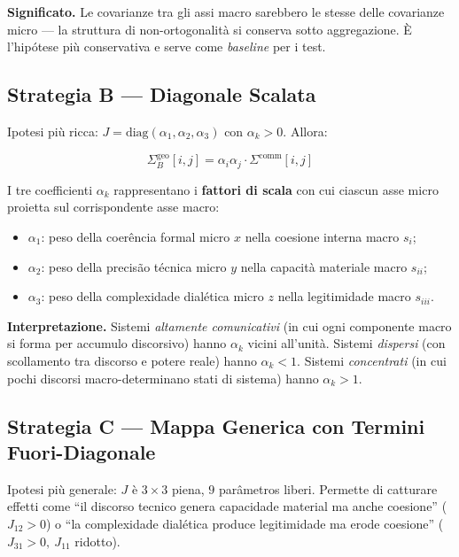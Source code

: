 \Hypoth{} \textbf{Significato.} Le covarianze tra gli assi macro
sarebbero le stesse delle covarianze micro --- la struttura di
non-ortogonalità si conserva sotto aggregazione. È l'hipótese più
conservativa e serve come \emph{baseline} per i test.

\subsection{Strategia B --- Diagonale
Scalata}\label{strategia-b-diagonale-scalata}

Ipotesi più ricca: \(J = \text{diag}(\alpha_1, \alpha_2, \alpha_3)\) con
\(\alpha_k > 0\). Allora:

\[
\Sigma^{\text{geo}}_B[i,j] = \alpha_i \alpha_j \cdot \Sigma^{\text{comm}}[i,j]
\]

I tre coefficienti \(\alpha_k\) rappresentano i \textbf{fattori di
scala} con cui ciascun asse micro proietta sul corrispondente asse
macro:

\begin{itemize}
\tightlist
\item
  \(\alpha_1\): peso della coerência formal micro \(x\) nella coesione
  interna macro \(s_i\);
\item
  \(\alpha_2\): peso della precisão técnica micro \(y\) nella capacità
  materiale macro \(s_{ii}\);
\item
  \(\alpha_3\): peso della complexidade dialética micro \(z\) nella
  legitimidade macro \(s_{iii}\).
\end{itemize}

\Hypoth{} \textbf{Interpretazione.} Sistemi \emph{altamente
comunicativi} (in cui ogni componente macro si forma per accumulo
discorsivo) hanno \(\alpha_k\) vicini all'unità. Sistemi \emph{dispersi}
(con scollamento tra discorso e potere reale) hanno \(\alpha_k < 1\).
Sistemi \emph{concentrati} (in cui pochi discorsi macro-determinano
stati di sistema) hanno \(\alpha_k > 1\).

\subsection{Strategia C --- Mappa Generica con Termini
Fuori-Diagonale}\label{strategia-c-mappa-generica-con-termini-fuori-diagonale}

Ipotesi più generale: \(J\) è \(3 \times 3\) piena, \(9\) parâmetros
liberi. Permette di catturare effetti come ``il discorso tecnico genera
capacidade material ma anche coesione'' (\(J_{12} > 0\)) o ``la
complexidade dialética produce legitimidade ma erode coesione''
(\(J_{31} > 0,\ J_{11}\) ridotto).

